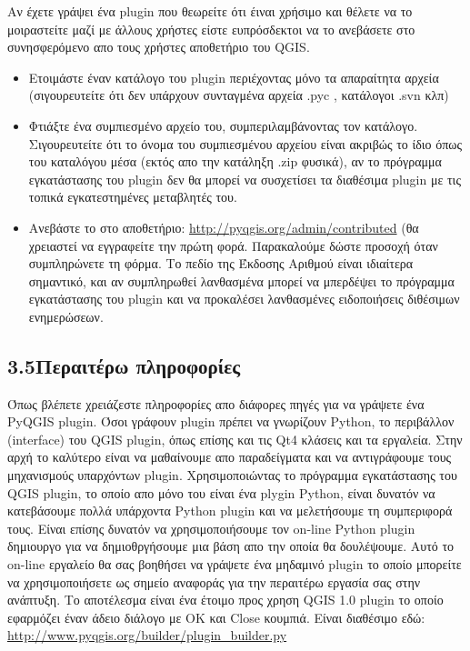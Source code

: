 Αν έχετε γράψει ένα plugin που θεωρείτε ότι έιναι χρήσιμο και θέλετε να το μοιραστείτε μαζί με άλλους χρήστες είστε ευπρόσδεκτοι να το ανεβάσετε στο συνησφερόμενο απο τους χρήστες αποθετήριο του QGIS.
\begin{itemize}
\item Ετοιμάστε έναν κατάλογο του plugin περιέχοντας μόνο τα απαραίτητα αρχεία (σιγουρευτείτε ότι δεν υπάρχουν συνταγμένα αρχεία .pyc , κατάλογοι .svn κλπ)
\item Φτιάξτε ένα συμπιεσμένο αρχείο του, συμπεριλαμβάνοντας τον κατάλογο. Σιγουρευτείτε ότι το όνομα του συμπιεσμένου αρχείου είναι ακριβώς το ίδιο όπως του καταλόγου μέσα (εκτός απο την κατάληξη .zip φυσικά), αν το πρόγραμμα εγκατάστασης του plugin δεν θα μπορεί να συσχετίσει τα διαθέσιμα plugin με τις τοπικά εγκατεστημένες μεταβλητές του.
\item Ανεβάστε το στο αποθετήριο: \url{http://pyqgis.org/admin/contributed} (θα χρειαστεί να εγγραφείτε την πρώτη φορά. Παρακαλούμε δώστε προσοχή όταν συμπληρώνετε τη φόρμα. Το πεδίο της Έκδοσης Αριθμού είναι ιδιαίτερα σημαντικό, και αν συμπληρωθεί λανθασμένα μπορεί να μπερδέψει το πρόγραμμα εγκατάστασης του plugin και να προκαλέσει λανθασμένες ειδοποιήσεις διθέσιμων ενημερώσεων. 
\end{itemize}

\subsection{3.5Περαιτέρω πληροφορίες}

Όπως βλέπετε χρειάζεστε πληροφορίες απο διάφορες πηγές για να γράψετε ένα PyQGIS plugin. Όσοι γράφουν plugin πρέπει να γνωρίζουν Python, το περιβάλλον (interface) του QGIS plugin, όπως επίσης και τις Qt4 κλάσεις και τα εργαλεία.  Στην αρχή το καλύτερο είναι να μαθαίνουμε απο παραδείγματα και να αντιγράφουμε τους μηχανισμούς υπαρχόντων plugin. Χρησιμοποιώντας το πρόγραμμα εγκατάστασης του QGIS plugin, το οποίο απο μόνο του είναι ένα plygin Python, είναι δυνατόν να κατεβάσουμε πολλά υπάρχοντα Python plugin και να μελετήσουμε τη συμπεριφορά τους. Είναι επίσης δυνατόν να χρησιμοποιήσουμε τον on-line Python plugin δημιουργο για να δημιοθργήσουμε μια βάση απο την οποία θα δουλέψουμε. Αυτό το on-line εργαλείο θα σας βοηθήσει να γράψετε ένα μηδαμινό plugin το οποίο μπορείτε να χρησιμοποιήσετε ως σημείο αναφοράς για την περαιτέρω εργασία σας στην ανάπτυξη. Το αποτέλεσμα είναι ένα έτοιμο προς χρηση QGIS 1.0 plugin
 το οποίο εφαρμόζει έναν άδειο διάλογο με ΟΚ και Close κουμπιά. Είναι διαθέσιμο εδώ: \url{http://www.pyqgis.org/builder/plugin\_builder.py}

